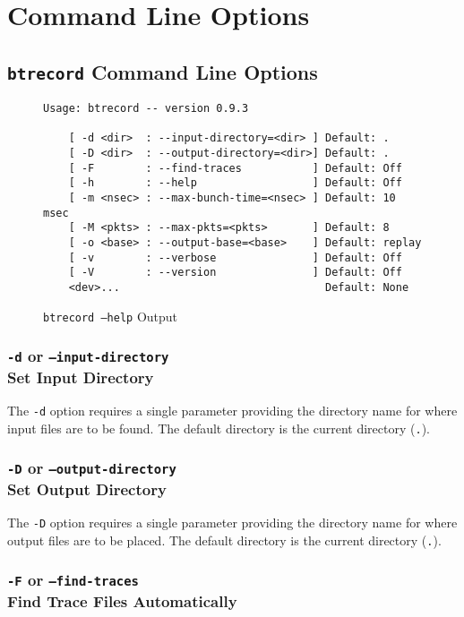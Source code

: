\documentclass{article}
\begin{document}
\newpage\section{\label{sec:command-line}Command Line Options}
\subsection{\texttt{btrecord} Command Line Options}
\begin{figure}[h!]
\begin{verbatim}
Usage: btrecord -- version 0.9.3

	[ -d <dir>  : --input-directory=<dir> ] Default: .
	[ -D <dir>  : --output-directory=<dir>] Default: .
	[ -F        : --find-traces           ] Default: Off
	[ -h        : --help                  ] Default: Off
	[ -m <nsec> : --max-bunch-time=<nsec> ] Default: 10 msec
	[ -M <pkts> : --max-pkts=<pkts>       ] Default: 8
	[ -o <base> : --output-base=<base>    ] Default: replay
	[ -v        : --verbose               ] Default: Off
	[ -V        : --version               ] Default: Off
	<dev>...                                Default: None
\end{verbatim}
\caption{\label{fig:btrecord--help}\texttt{btrecord --help} Output}
\end{figure}
\FloatBarrier

\subsubsection{\label{sec:c-o-d}\texttt{-d} or
\texttt{--input-directory}\\Set Input Directory}

The \texttt{-d} option requires a single parameter providing the directory
name for where input files are to be found. The default directory is the
current directory (\texttt{.}).

\subsubsection{\label{sec:c-o-D}\texttt{-D} or
\texttt{--output-directory}\\Set Output Directory}

The \texttt{-D} option requires a single parameter providing the directory
name for where output files are to be placed. The default directory is the
current directory (\texttt{.}).

\subsubsection{\texttt{-F} or \texttt{--find-traces}\\Find Trace Files
Automatically}
\end{document}
